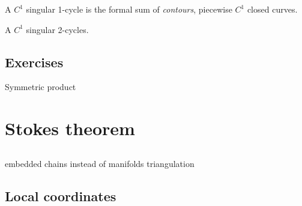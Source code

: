 \documentclass{../../large}
\begin{document}
\begin{prb}
A $C^1$ singular 1-cycle is the formal sum of \emph{contours}, piecewise $C^1$ closed curves.
\end{prb}

\begin{prb}
A $C^1$ singular 2-cycles.
\end{prb}



\section*{Exercises}

\begin{prb}
Symmetric product
\end{prb}

\begin{prb}
\end{prb}

\begin{prb}
\end{prb}








\chapter{Stokes theorem}


\section{}

embedded chains instead of manifolds
triangulation

\section{Local coordinates}
\end{document}
